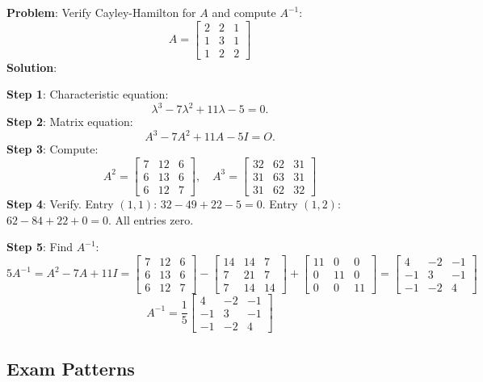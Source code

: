 \documentclass[
]{article}
\begin{document}
\textbf{Problem}: Verify Cayley-Hamilton for \(A\) and compute
\(A^{-1}\):
\[
A =
\begin{bmatrix}
2 & 2 & 1 \\
1 & 3 & 1 \\
1 & 2 & 2
\end{bmatrix}
\]
\textbf{Solution}:

\textbf{Step 1}: Characteristic equation:
\[
\lambda^3 - 7\lambda^2 + 11\lambda - 5 = 0.
\]
\textbf{Step 2}: Matrix equation:
\[
A^3 - 7A^2 + 11A - 5I = O.
\]
\textbf{Step 3}: Compute:
\[
A^2 =
\begin{bmatrix}
7 & 12 & 6 \\
6 & 13 & 6 \\
6 & 12 & 7
\end{bmatrix}, \quad A^3 = \begin{bmatrix} 32 & 62 & 31 \\ 31 & 63 & 31 \\ 31 & 62 & 32 \end{bmatrix}
\]
\textbf{Step 4}: Verify. Entry \((1,1)\): \(32 - 49 + 22 - 5 = 0\).
Entry \((1,2)\): \(62 - 84 + 22 + 0 = 0\). All entries zero.

\textbf{Step 5}: Find \(A^{-1}\):
\[
5A^{-1} = A^2 - 7A + 11I =
\begin{bmatrix}
7 & 12 & 6 \\
6 & 13 & 6 \\
6 & 12 & 7
\end{bmatrix} - \begin{bmatrix} 14 & 14 & 7 \\ 7 & 21 & 7 \\ 7 & 14 & 14 \end{bmatrix} + \begin{bmatrix} 11 & 0 & 0 \\ 0 & 11 & 0 \\ 0 & 0 & 11 \end{bmatrix} = \begin{bmatrix} 4 & -2 & -1 \\ -1 & 3 & -1 \\ -1 & -2 & 4 \end{bmatrix}
\]
\[
A^{-1} = \frac{1}{5}
\begin{bmatrix}
4 & -2 & -1 \\
-1 & 3 & -1 \\
-1 & -2 & 4
\end{bmatrix}
\]

\subsection{Exam Patterns}\label{exam-patterns-26}
\end{document}
